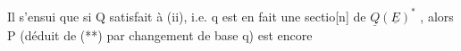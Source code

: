 Il s'ensui que si Q satisfait à (ii), i.e.  q est en fait une sectio[n]
de $\underline{Q}(\underline{E})^*$\hand{\unsure{$\hat{}$}} , alors P (déduit de (**) par  changement de base q) est encore

